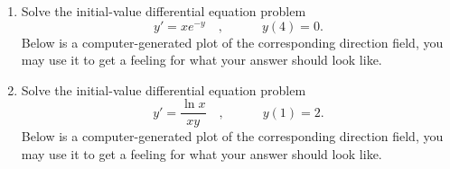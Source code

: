 \begin{enumerate}
\item Solve the initial-value differential equation problem 
\[
y'=xe^{-y} 
\quad,\quad  \quad \quad y(4)=0.
\]
Below is a computer-generated plot of the corresponding direction field, you may use it to get a feeling for what your answer should look like.


\item Solve the initial-value differential equation problem 
\[
y'=\frac{\ln x}{x y}
\quad,\quad  \quad \quad y(1)=2.
\]
Below is a computer-generated plot of the corresponding direction field, you may use it to get a feeling for what your answer should look like.

\end{enumerate}